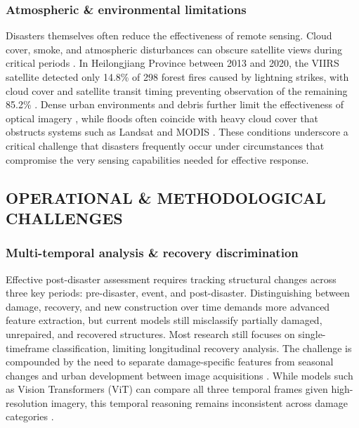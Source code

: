 \documentclass[conference,a4paper]{IEEEtran}
\begin{document}
\subsubsection{\textbf{Atmospheric \& environmental limitations}}
Disasters themselves often reduce the effectiveness of remote sensing. Cloud cover, smoke, and atmospheric disturbances can obscure satellite views during critical periods \cite{lagapEnhancingPostDisasterDamage2025}. In Heilongjiang Province between 2013 and 2020, the VIIRS satellite detected only 14.8\% of 298 forest fires caused by lightning strikes, with cloud cover and satellite transit timing preventing observation of the remaining 85.2\% \cite{jiaoForestFirePatterns2023}. Dense urban environments and debris further limit the effectiveness of optical imagery \cite{lagapEnhancingPostDisasterDamage2025}, while floods often coincide with heavy cloud cover that obstructs systems such as Landsat and MODIS \cite{teohExploringGenerativeAI2024}. These conditions underscore a critical challenge that disasters frequently occur under circumstances that compromise the very sensing capabilities needed for effective response.


\subsection{OPERATIONAL \& METHODOLOGICAL CHALLENGES}

\subsubsection{\textbf{Multi-temporal analysis \& recovery discrimination}}
Effective post-disaster assessment requires tracking structural changes across three key periods: pre-disaster, event, and post-disaster. Distinguishing between damage, recovery, and new construction over time demands more advanced feature extraction, but current models still misclassify partially damaged, unrepaired, and recovered structures. Most research still focuses on single-timeframe classification, limiting longitudinal recovery analysis. The challenge is compounded by the need to separate damage-specific features from seasonal changes and urban development between image acquisitions \cite{kimDisasterAssessmentUsing2022}. While models such as Vision Transformers (ViT) can compare all three temporal frames given high-resolution imagery, this temporal reasoning remains inconsistent across damage categories \cite{lagapEnhancingPostDisasterDamage2025}.
\end{document}
